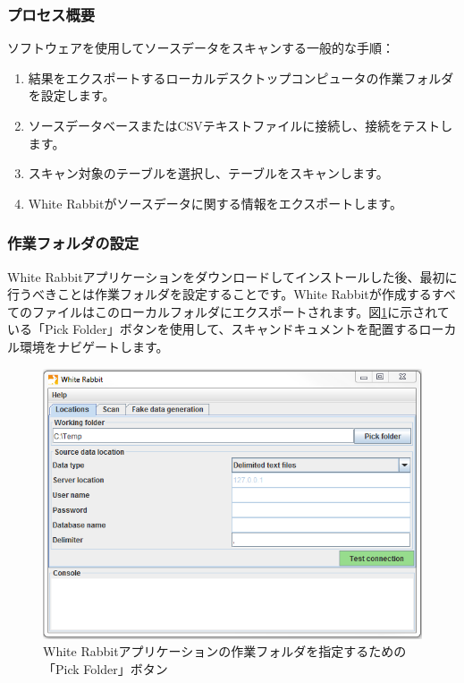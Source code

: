 \documentclass[
  11pt]{book}
\providecommand{\tightlist}{%
  \setlength{\itemsep}{0pt}\setlength{\parskip}{0pt}}
\theoremstyle{definition}
\theoremstyle{definition}
\theoremstyle{definition}
\theoremstyle{definition}
\theoremstyle{remark}
\begin{document}
\subsubsection*{プロセス概要}\label{ux30d7ux30edux30bbux30b9ux6982ux8981}

ソフトウェアを使用してソースデータをスキャンする一般的な手順：

\begin{enumerate}
\def\labelenumi{\arabic{enumi}.}
\tightlist
\item
  結果をエクスポートするローカルデスクトップコンピュータの作業フォルダを設定します。
\item
  ソースデータベースまたはCSVテキストファイルに接続し、接続をテストします。
\item
  スキャン対象のテーブルを選択し、テーブルをスキャンします。
\item
  White Rabbitがソースデータに関する情報をエクスポートします。
\end{enumerate}

\subsubsection*{作業フォルダの設定}\label{ux4f5cux696dux30d5ux30a9ux30ebux30c0ux306eux8a2dux5b9a}

White Rabbitアプリケーションをダウンロードしてインストールした後、最初に行うべきことは作業フォルダを設定することです。White Rabbitが作成するすべてのファイルはこのローカルフォルダにエクスポートされます。図\ref{fig:WhiteRabbitLocation}に示されている「Pick Folder」ボタンを使用して、スキャンドキュメントを配置するローカル環境をナビゲートします。

\begin{figure}

{\centering \includegraphics[width=1\linewidth]{images/ExtractTransformLoad/WhiteRabbitLocation} 

}

\caption{White Rabbitアプリケーションの作業フォルダを指定するための「Pick Folder」ボタン}\label{fig:WhiteRabbitLocation}
\end{figure}
\end{document}
